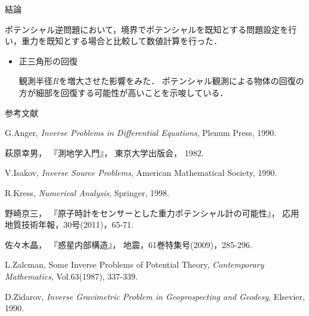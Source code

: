 \documentclass[dvipdfmx]{beamer}
\begin{document}
\begin{frame}{結論}

  ポテンシャル逆問題において，境界でポテンシャルを既知とする問題設定を行い，重力を既知とする場合と比較して数値計算を行った．

  \begin{itemize}

    \item 正三角形の回復

    観測半径$R$を増大させた影響をみた．
    ポテンシャル観測による物体の回復の方が細部を回復する可能性が高いことを示唆している．
  \end{itemize}

\end{frame}

\begin{frame}{参考文献}
  \begin{thebibliography}{99}
    G.Anger, 
    \textit{Inverse Problems in Differential Equations},
    Plenum Press,
    1990.
  
    萩原幸男，
    『測地学入門』，
    東京大学出版会，
    1982.
  
    V.Isakov,
    \textit{Inverse Source Problems},
    American Mathematical Society,
    1990.
  
    R.Kress,
    \textit{Numerical Analysis},
    Springer,
    1998.
  
    野崎京三，
    『原子時計をセンサーとした重力ポテンシャル計の可能性』，
    応用地質技術年報，30号(2011)，65-71.
  
    佐々木晶，
    『惑星内部構造』，
    地震，61巻特集号(2009)，285-296.
  
  
    L.Zalcman,
    Some Inverse Problems of Potential Theory,
    \textit{Contemporary Mathematics}, Vol.63(1987), 337-339.
  
    D.Zidarov, 
    \textit{Inverse Gravimetric Problem in Geoprospecting and Geodesy},
    Elsevier,
    1990.
  \end{thebibliography}

\end{frame}
\end{document}
